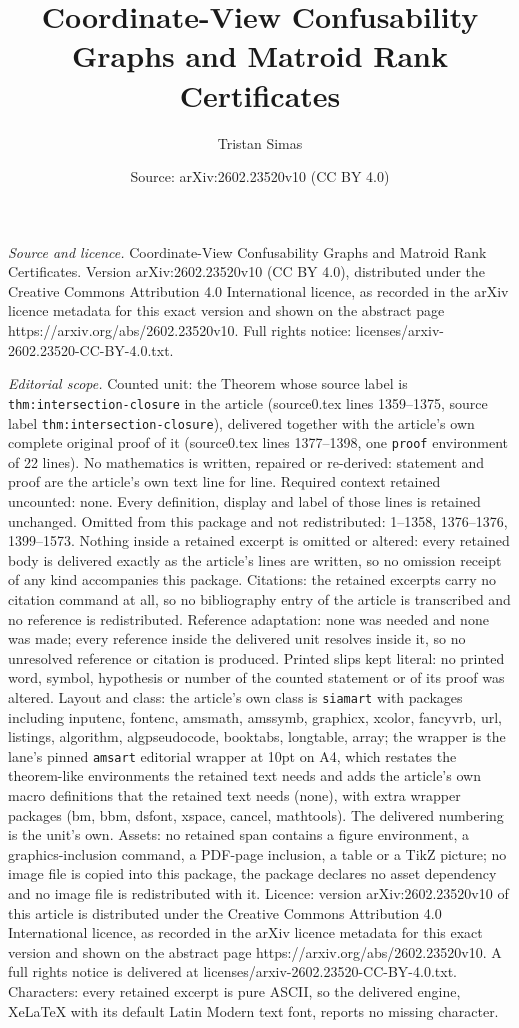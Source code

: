 \documentclass[10pt,a4paper]{amsart}
\title[Coordinate-View Confusability Graphs and Matroid Rank Certif]{Coordinate-View Confusability Graphs and Matroid Rank Certificates}
\author{Tristan Simas}
\date{Source: arXiv:2602.23520v10 (CC BY 4.0)}
\begin{document}
\maketitle

\noindent\emph{Source and licence.} Coordinate-View Confusability Graphs and Matroid Rank Certificates. Version arXiv:2602.23520v10 (CC BY 4.0), distributed under the Creative Commons Attribution 4.0 International licence, as recorded in the arXiv licence metadata for this exact version and shown on the abstract page https://arxiv.org/abs/2602.23520v10. Full rights notice: licenses/arxiv-2602.23520-CC-BY-4.0.txt.\par\smallskip

\noindent\textit{Editorial scope.} Counted unit: the Theorem whose source label is \texttt{thm:intersection-closure} in the article (source0.tex lines 1359--1375, source label \texttt{thm:intersection-closure}), delivered together with the article's own complete original proof of it (source0.tex lines 1377--1398, one \texttt{proof} environment of 22 lines). No mathematics is written, repaired or re-derived: statement and proof are the article's own text line for line. Required context retained uncounted: none. Every definition, display and label of those lines is retained unchanged. Omitted from this package and not redistributed: 1--1358, 1376--1376, 1399--1573. Nothing inside a retained excerpt is omitted or altered: every retained body is delivered exactly as the article's lines are written, so no omission receipt of any kind accompanies this package. Citations: the retained excerpts carry no citation command at all, so no bibliography entry of the article is transcribed and no reference is redistributed. Reference adaptation: none was needed and none was made; every reference inside the delivered unit resolves inside it, so no unresolved reference or citation is produced. Printed slips kept literal: no printed word, symbol, hypothesis or number of the counted statement or of its proof was altered. Layout and class: the article's own class is \texttt{siamart} with packages including inputenc, fontenc, amsmath, amssymb, graphicx, xcolor, fancyvrb, url, listings, algorithm, algpseudocode, booktabs, longtable, array; the wrapper is the lane's pinned \texttt{amsart} editorial wrapper at 10pt on A4, which restates the theorem-like environments the retained text needs and adds the article's own macro definitions that the retained text needs (none), with extra wrapper packages (bm, bbm, dsfont, xspace, cancel, mathtools). The delivered numbering is the unit's own. Assets: no retained span contains a figure environment, a graphics-inclusion command, a PDF-page inclusion, a table or a TikZ picture; no image file is copied into this package, the package declares no asset dependency and no image file is redistributed with it. Licence: version arXiv:2602.23520v10 of this article is distributed under the Creative Commons Attribution 4.0 International licence, as recorded in the arXiv licence metadata for this exact version and shown on the abstract page https://arxiv.org/abs/2602.23520v10. A full rights notice is delivered at licenses/arxiv-2602.23520-CC-BY-4.0.txt. Characters: every retained excerpt is pure ASCII, so the delivered engine, XeLaTeX with its default Latin Modern text font, reports no missing character.
\end{document}
